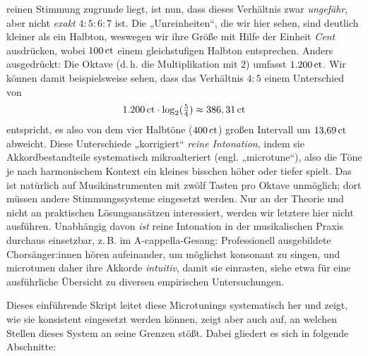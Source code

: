 reinen Stimmung zugrunde liegt, ist nun, dass dieses Verhältnis zwar
\emph{ungefähr}, aber nicht \emph{exakt} $4:5:6:7$ ist. Die „Unreinheiten“, die
wir hier sehen, sind deutlich kleiner als ein Halbton, weswegen wir ihre
Größe mit Hilfe der Einheit \emph{Cent} ausdrücken, wobei $100\,\text{ct}$ einem
gleichstufigen Halbton entsprechen. Anders ausgedrückt: Die Oktave (d.\,h. die
Multiplikation mit $2$) umfasst $1{.}200\,\text{ct}$. Wir können damit
beispielsweise sehen, dass das Verhältnis $4:5$ einem Unterschied von
\[1{.}200\,\text{ct}\cdot \log_2(\tfrac54) \approx 386,31\,\text{ct}\]%
entspricht, es also von dem vier Halbtöne ($400\,\text{ct}$) großen Intervall um
$13{,}69\,\text{ct}$ abweicht. Diese Unterschiede „korrigiert“ \emph{reine
  Intonation}, indem sie Akkordbestandteile systematisch mikroalteriert
(engl. „microtune“), also die Töne je nach harmonischem Kontext ein kleines
bisschen höher oder tiefer spielt. Das ist natürlich auf Musikinstrumenten mit
zwölf Tasten pro Oktave unmöglich; dort müssen andere Stimmungssysteme
eingesetzt werden. Nur an der Theorie und nicht an praktischen Lösungsansätzen
interessiert, werden wir letztere hier nicht ausführen. Unabhängig davon
\emph{ist} reine Intonation in der musikalischen Praxis durchaus einsetzbar,
z.\,B. im A-cappella-Gesang: Professionell ausgebildete Chorsänger:innen hören
aufeinander, um möglichst konsonant zu singen, und microtunen daher ihre Akkorde
\emph{intuitiv}, damit sie einrasten, siehe etwa \cite[§\,2.4]{Maria} für eine
ausführliche Übersicht zu diversen empirischen Untersuchungen.

Dieses einführende Skript leitet diese Microtunings systematisch her und zeigt,
wie sie konsistent eingesetzt werden können, zeigt aber auch auf, an welchen
Stellen dieses System an seine Grenzen stößt. Dabei gliedert es sich in folgende
Abschnitte:

